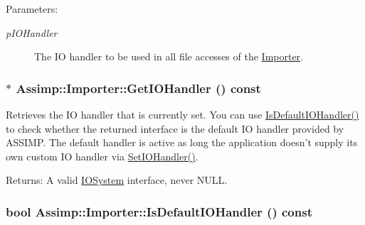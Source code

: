\begin{Desc}
\item[Parameters:]
\begin{description}
\item[{\em pIOHandler}]The IO handler to be used in all file accesses of the \hyperlink{class_assimp_1_1_importer}{Importer}. \end{description}
\end{Desc}
\hypertarget{class_assimp_1_1_importer_be3af30f4c5eae2e875b0f32068be44d}{
\subsubsection[GetIOHandler]{$\ast$ Assimp::Importer::GetIOHandler () const}}
\label{class_assimp_1_1_importer_be3af30f4c5eae2e875b0f32068be44d}


Retrieves the IO handler that is currently set. You can use \hyperlink{class_assimp_1_1_importer_e3f26466cf7756594216ffedbc247563}{IsDefaultIOHandler()} to check whether the returned interface is the default IO handler provided by ASSIMP. The default handler is active as long the application doesn't supply its own custom IO handler via \hyperlink{class_assimp_1_1_importer_1161f46318af18bb86dfe0fc3edea4df}{SetIOHandler()}. \begin{Desc}
\item[Returns:]A valid \hyperlink{class_assimp_1_1_i_o_system}{IOSystem} interface, never NULL. \end{Desc}
\hypertarget{class_assimp_1_1_importer_e3f26466cf7756594216ffedbc247563}{
\subsubsection[IsDefaultIOHandler]{\setlength{\rightskip}{0pt plus 5cm}bool Assimp::Importer::IsDefaultIOHandler () const}}
\label{class_assimp_1_1_importer_e3f26466cf7756594216ffedbc247563}



